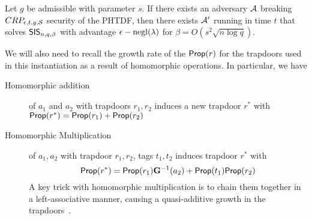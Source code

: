 \begin{theorem}
Let $g$ be admissible with parameter $s$. 
If there exists an adversary $\mathcal{A}$ breaking
$CRP_{\epsilon,t,g,\mathcal{S}}$ security of the PHTDF, then there exists
$\mathcal{A}'$ running in time $t$ that solves $\mathsf{SIS}_{n,q,\beta}$ with
advantage $\epsilon-\operatorname{negl}(\lambda)$ for $\beta=O(s^2\sqrt{n
  \log{q}})$. 
\end{theorem}

We will also need to recall the growth rate of the $\mathsf{Prop}(r)$ for
the trapdoors used in this instantiation as a result of homomorphic
operations. In particular, we have 
\begin{description}
\item[Homomorphic addition] of $a_1$
and $a_2$ with trapdoors $r_1, r_2$ induces a new trapdoor $r^*$ with 
$\mathsf{Prop}(r^*)=\mathsf{Prop}(r_1)+\mathsf{Prop}(r_2)$ 
\item[Homomorphic Multiplication] of $a_1, a_2$ with trapdoor $r_1,
  r_2$, tags $t_1,t_2$ induces trapdoor $r^*$ with 
\[\mathsf{Prop}(r^*)=\mathsf{Prop}(r_1)\mathbf{G}^{-1}(a_2)+\mathsf{Prop}(t_1)\mathsf{Prop}(r_2)\]
A key trick with homomorphic multiplication is to chain them together
in a left-associative manner, causing a quasi-additive growth in the trapdoors~\cite{DBLP:conf/innovations/BrakerskiV14,DBLP:conf/crypto/Alperin-SheriffP14}.
\end{description}
